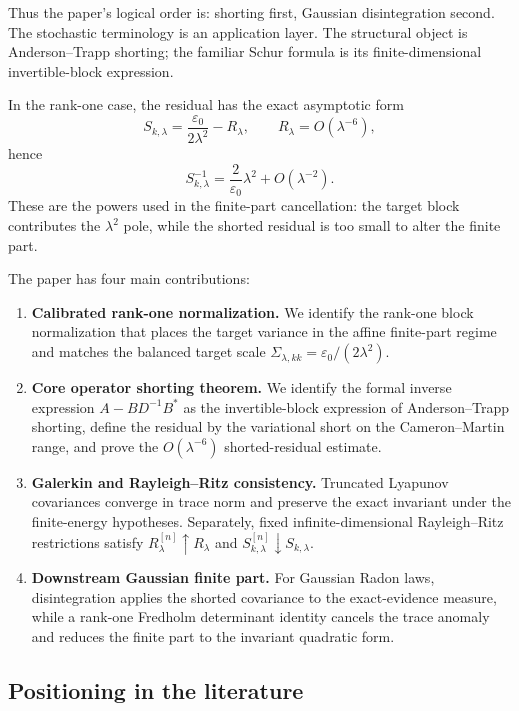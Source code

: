 \documentclass[preprint,12pt]{elsarticle}
\theoremstyle{plain}
\theoremstyle{definition}
\theoremstyle{remark}
\begin{document}
    Thus the paper's logical order is:
    shorting first, Gaussian disintegration second.  The stochastic terminology
    is an application layer.  The structural object is Anderson--Trapp shorting;
    the familiar Schur formula is its finite-dimensional invertible-block
    expression.

    In the rank-one case, the residual has the exact asymptotic form
    \[
    S_{k,\lambda}=\frac{\varepsilon_0}{2\lambda^2}-R_\lambda,
    \qquad
    R_\lambda=O(\lambda^{-6}),
    \]
    hence
    \[
    S_{k,\lambda}^{-1}=\frac{2}{\varepsilon_0}\lambda^2+O(\lambda^{-2}).
    \]
    These are the powers used in the finite-part cancellation: the target
    block contributes the $\lambda^2$ pole, while the shorted residual is too
    small to alter the finite part.

    The paper has four main contributions:
    \begin{enumerate}
        \item \textbf{Calibrated rank-one normalization.} We identify the
        rank-one block normalization that places the target variance in the
        affine finite-part regime and matches the balanced target scale
        $\Sigma_{\lambda,kk}=\varepsilon_0/(2\lambda^2)$.
        \item \textbf{Core operator shorting theorem.} We identify the formal
        inverse expression $A-BD^{-1}B^*$ as the invertible-block expression of
        Anderson--Trapp shorting, define the residual by the variational short
        on the Cameron--Martin range, and prove the $O(\lambda^{-6})$
        shorted-residual estimate.
        \item \textbf{Galerkin and Rayleigh--Ritz consistency.} Truncated
        Lyapunov covariances converge in trace norm and preserve the exact
        invariant under the finite-energy hypotheses.  Separately, fixed
        infinite-dimensional Rayleigh--Ritz restrictions satisfy
        $R_\lambda^{[n]}\uparrow R_\lambda$ and
        $S_{k,\lambda}^{[n]}\downarrow S_{k,\lambda}$.
        \item \textbf{Downstream Gaussian finite part.} For Gaussian
        Radon laws, disintegration applies the shorted covariance to the
        exact-evidence measure, while a rank-one Fredholm determinant identity
        cancels the trace anomaly and reduces the finite part to the invariant
        quadratic form.
    \end{enumerate}

    \subsection{Positioning in the literature}
    \label{sec:related}
\end{document}
